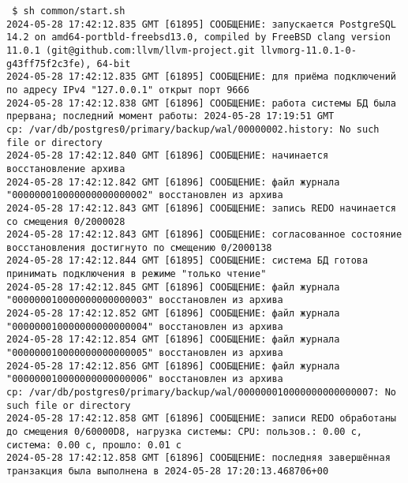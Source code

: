 \documentclass{article}
\begin{document}
\texttt{
\$ sh common/start.sh  \\
2024-05-28 17:42:12.835 GMT [61895] СООБЩЕНИЕ:  запускается PostgreSQL 14.2 on amd64-portbld-freebsd13.0, compiled by FreeBSD clang version 11.0.1 (git@github.com:llvm/llvm-project.git llvmorg-11.0.1-0-g43ff75f2c3fe), 64-bit\\
2024-05-28 17:42:12.835 GMT [61895] СООБЩЕНИЕ:  для приёма подключений по адресу IPv4 "127.0.0.1" открыт порт 9666\\
2024-05-28 17:42:12.838 GMT [61896] СООБЩЕНИЕ:  работа системы БД была прервана; последний момент работы: 2024-05-28 17:19:51 GMT\\
cp: /var/db/postgres0/primary/backup/wal/00000002.history: No such file or directory\\
2024-05-28 17:42:12.840 GMT [61896] СООБЩЕНИЕ:  начинается восстановление архива\\
2024-05-28 17:42:12.842 GMT [61896] СООБЩЕНИЕ:  файл журнала "000000010000000000000002" восстановлен из архива\\
2024-05-28 17:42:12.843 GMT [61896] СООБЩЕНИЕ:  запись REDO начинается со смещения 0/2000028\\
2024-05-28 17:42:12.843 GMT [61896] СООБЩЕНИЕ:  согласованное состояние восстановления достигнуто по смещению 0/2000138\\
2024-05-28 17:42:12.844 GMT [61895] СООБЩЕНИЕ:  система БД готова принимать подключения в режиме "только чтение"\\
2024-05-28 17:42:12.845 GMT [61896] СООБЩЕНИЕ:  файл журнала "000000010000000000000003" восстановлен из архива\\
2024-05-28 17:42:12.852 GMT [61896] СООБЩЕНИЕ:  файл журнала "000000010000000000000004" восстановлен из архива\\
2024-05-28 17:42:12.854 GMT [61896] СООБЩЕНИЕ:  файл журнала "000000010000000000000005" восстановлен из архива\\
2024-05-28 17:42:12.856 GMT [61896] СООБЩЕНИЕ:  файл журнала "000000010000000000000006" восстановлен из архива\\
cp: /var/db/postgres0/primary/backup/wal/000000010000000000000007: No such file or directory\\
2024-05-28 17:42:12.858 GMT [61896] СООБЩЕНИЕ:  записи REDO обработаны до смещения 0/60000D8, нагрузка системы: CPU: пользов.: 0.00 с, система: 0.00 с, прошло: 0.01 с\\
2024-05-28 17:42:12.858 GMT [61896] СООБЩЕНИЕ:  последняя завершённая транзакция была выполнена в 2024-05-28 17:20:13.468706+00\\
}
\end{document}
